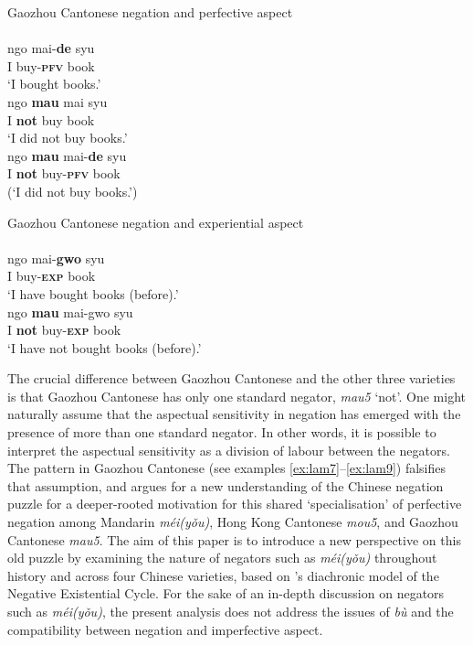 \documentclass[output=paper,colorlinks,citecolor=brown,chinesefont]{langscibook}
\begin{document}
\ea Gaozhou Cantonese negation and perfective aspect \label{ex:lam8}\\
   \label{ex:lam8a}\\
  	\gll ngo mai-\textbf{de} syu\\
  	I buy-\textbf{\textsc{pfv}} book\\
 	 \glt `I bought books.'	
   \label{ex:lam8b}\\
  	\gll ngo \textbf{mau} mai syu\\
  	I \textbf{not} buy book\\
  	\glt `I did not buy books.'
   \label{ex:lam8c}\\
	\gll *ngo \textbf{mau} mai-\textbf{de} syu\\
	I \textbf{not} buy-\textbf{\textsc{pfv}} book\\
	\glt (`I did not buy books.')
\z \z 


\ea Gaozhou Cantonese negation and experiential aspect \label{ex:lam9}\\
   \label{ex:lam9a}\\
  	\gll ngo mai-\textbf{gwo} syu \\
  	I buy-\textbf{\textsc{exp}} book\\
  	\glt `I have bought books (before).'
   \label{ex:lam9b}\\
  	\gll ngo	 \textbf{mau} mai-gwo syu \\
  	I \textbf{not} buy-\textbf{\textsc{exp}} book\\
  	\glt `I have not bought books (before).'
\z \z 


The crucial difference between Gaozhou Cantonese and the other three varieties is that Gaozhou Cantonese has only one standard negator, \textit{mau5} `not'. One might naturally assume that the aspectual sensitivity in negation has emerged with the presence of more than one standard negator. In other words, it is possible to interpret the aspectual sensitivity as a division of labour between the negators. The pattern in Gaozhou Cantonese (see examples \ref{ex:lam7}--\ref{ex:lam9}) falsifies that assumption, and argues for a new understanding of the Chinese negation puzzle for a deeper-rooted motivation for this shared `specialisation' of perfective negation among Mandarin \textit{méi(yǒu)}, Hong Kong Cantonese \textit{mou5}, and Gaozhou Cantonese \textit{mau5}. The aim of this paper is to introduce a new perspective on this old puzzle by examining the nature of negators such as \textit{méi(yǒu)} throughout history and across four Chinese varieties, based on \citeauthor{Croft1991}'s diachronic model of the Negative Existential Cycle. For the sake of an in-depth discussion on negators such as \textit{méi(yǒu)}, the present analysis does not address the issues of \textit{bù} and the compatibility between negation and imperfective aspect.
\end{document}
